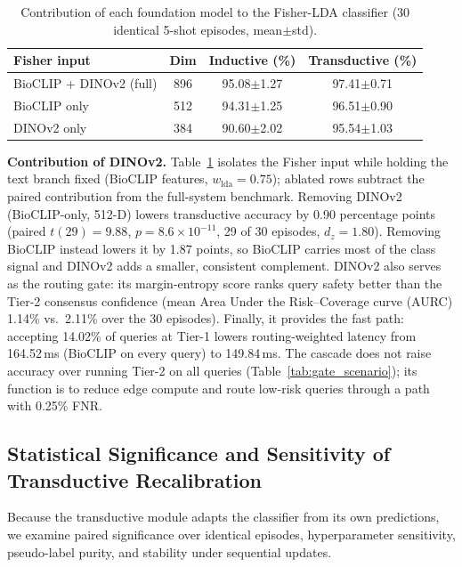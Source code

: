 \documentclass[preprint,12pt]{elsarticle}
\begin{document}
\begin{table}[htbp]
\centering
\caption{Contribution of each foundation model to the Fisher-LDA classifier (30 identical 5-shot episodes, mean$\pm$std).}
\label{tab:feature_ablation}
\footnotesize
\setlength{\tabcolsep}{4pt}
\begin{tabular*}{\columnwidth}{@{\extracolsep{\fill}}lccc}
\toprule
\textbf{Fisher input} & \textbf{Dim} & \textbf{Inductive (\%)} & \textbf{Transductive (\%)} \\
\midrule
BioCLIP + DINOv2 (full) & 896 & 95.08$\pm$1.27 & 97.41$\pm$0.71 \\
BioCLIP only & 512 & 94.31$\pm$1.25 & 96.51$\pm$0.90 \\
DINOv2 only & 384 & 90.60$\pm$2.02 & 95.54$\pm$1.03 \\
\bottomrule
\end{tabular*}
\end{table}

\textbf{Contribution of DINOv2.} Table~\ref{tab:feature_ablation} isolates the Fisher input while holding the text branch fixed (BioCLIP features, $w_{\mathrm{lda}}=0.75$); ablated rows subtract the paired contribution from the full-system benchmark. Removing DINOv2 (BioCLIP-only, 512-D) lowers transductive accuracy by 0.90 percentage points (paired $t(29)=9.88$, $p=8.6\times10^{-11}$, 29 of 30 episodes, $d_z=1.80$). Removing BioCLIP instead lowers it by 1.87 points, so BioCLIP carries most of the class signal and DINOv2 adds a smaller, consistent complement. DINOv2 also serves as the routing gate: its margin-entropy score ranks query safety better than the Tier-2 consensus confidence (mean Area Under the Risk--Coverage curve (AURC) 1.14\% vs.\ 2.11\% over the 30 episodes). Finally, it provides the fast path: accepting 14.02\% of queries at Tier-1 lowers routing-weighted latency from 164.52\,ms (BioCLIP on every query) to 149.84\,ms. The cascade does not raise accuracy over running Tier-2 on all queries (Table~\ref{tab:gate_scenario}); its function is to reduce edge compute and route low-risk queries through a path with 0.25\% FNR.

\subsection{Statistical Significance and Sensitivity of Transductive Recalibration}
\label{sec:transductive_validation}
Because the transductive module adapts the classifier from its own predictions, we examine paired significance over identical episodes, hyperparameter sensitivity, pseudo-label purity, and stability under sequential updates.
\end{document}
